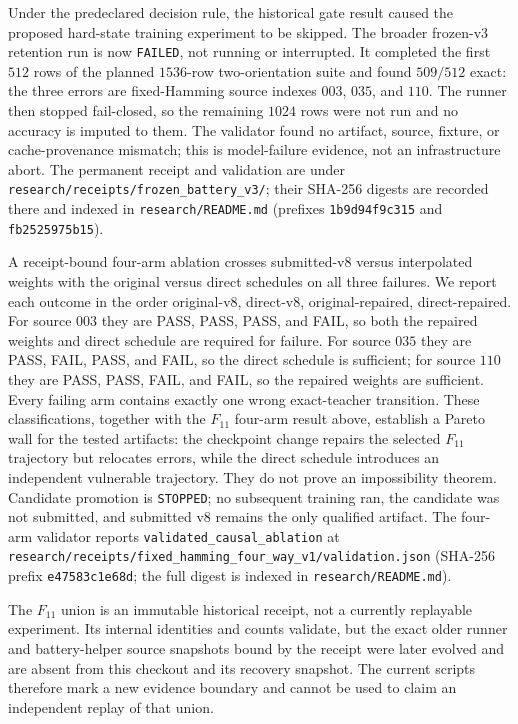 \documentclass[11pt]{article}
\begin{document}
Under the predeclared decision rule, the historical gate result caused
the proposed hard-state training experiment to be skipped. The broader frozen-v3
retention run is now \texttt{FAILED}, not running or interrupted. It completed
the first $512$ rows of the planned $1536$-row two-orientation suite and found
$509/512$ exact: the three errors are fixed-Hamming source indexes $003$, $035$,
and $110$. The runner then stopped fail-closed, so the remaining $1024$ rows were
not run and no accuracy is imputed to them. The validator found no artifact,
source, fixture, or cache-provenance mismatch; this is model-failure evidence,
not an infrastructure abort. The permanent receipt and validation are under
\nolinkurl{research/receipts/frozen_battery_v3/}; their SHA-256 digests are
recorded there and indexed in \nolinkurl{research/README.md} (prefixes
\texttt{1b9d94f9c315} and \texttt{fb2525975b15}).

A receipt-bound four-arm ablation crosses submitted-v8 versus interpolated
weights with the original versus direct schedules on all three failures. We
report each outcome in the order original-v8, direct-v8, original-repaired,
direct-repaired. For source $003$ they are PASS, PASS, PASS, and FAIL, so both
the repaired weights and direct schedule are required for failure. For source
$035$ they are PASS, FAIL, PASS, and FAIL, so the direct schedule is sufficient;
for source $110$ they are PASS, PASS, FAIL, and FAIL, so the repaired weights
are sufficient. Every failing
arm contains exactly one wrong exact-teacher transition. These classifications,
together with the $F_{11}$ four-arm result above, establish a Pareto wall for the
tested artifacts: the checkpoint change repairs the selected $F_{11}$ trajectory
but relocates errors, while the direct schedule introduces an independent
vulnerable trajectory. They do not prove an impossibility theorem. Candidate
promotion is \texttt{STOPPED}; no subsequent training ran, the candidate was not
submitted, and submitted v8 remains the only qualified artifact. The four-arm
validator reports \texttt{validated\_causal\_ablation} at
\nolinkurl{research/receipts/fixed_hamming_four_way_v1/validation.json}
(SHA-256 prefix \texttt{e47583c1e68d}; the full digest is indexed in
\nolinkurl{research/README.md}).

The $F_{11}$ union is an immutable historical receipt, not a currently
replayable experiment. Its internal identities and counts validate, but the
exact older runner and battery-helper source snapshots bound by the receipt
were later evolved and are absent from this checkout and its recovery snapshot.
The current scripts therefore mark a new evidence boundary and cannot be used
to claim an independent replay of that union.
\end{document}
